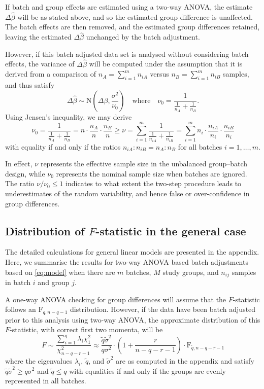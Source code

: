 \documentclass{bio}
\begin{document}
If batch and group effects are estimated using a two-way ANOVA, the estimate $\Delta\hat{\beta}$ will be as stated above, and so the estimated group difference is unaffected. The batch effects are then removed, and the estimated group differences retained, leaving the estimated $\Delta\hat{\beta}$ unchanged by the batch adjustment.

However, if this batch adjusted data set is analysed without considering batch effects, the variance of $\Delta\hat{\beta}$ will be computed under the assumption that it is derived from a comparison of $n_A=\sum_{i=1}^m n_{iA}$ versus $n_B=\sum_{i=1}^m n_{iB}$ samples, and thus satisfy
\begin{equation}
\Delta\hat{\beta}
\sim\text{N}\left(\Delta\beta,\frac{\sigma^2}{\nu_0}\right)
\quad\text{where}\quad
\nu_0=\frac{1}{\frac{1}{n_A}+\frac{1}{n_B}}.
\end{equation}
Using Jensen's inequality, we may derive
\begin{equation}
\nu_0
=\frac{1}{\frac{1}{n_A}+\frac{1}{n_B}}=n\cdot\frac{n_A}{n}\cdot\frac{n_B}{n}
\ge
\nu
=\sum_{i=1}^m \frac{1}{\frac{1}{n_{iA}}+\frac{1}{n_{iB}}}
=\sum_{i=1}^m n_i\cdot\frac{n_{iA}}{n_i}\cdot\frac{n_{iB}}{n_i}
\end{equation}
with equality if and only if the ratios $n_{iA}:n_{iB}=n_A:n_B$ for all batches $i=1,\ldots,m$.

In effect, $\nu$ represents the effective sample size in the unbalanced group--batch design, while $\nu_0$ represents the nominal sample size when batches are ignored. The ratio $\nu/\nu_0\le1$ indicates to what extent the two-step procedure leads to underestimates of the random variability, and hence false or over-confidence in group differences.


\subsection{Distribution of $F$-statistic in the general case}

The detailed calculations for general linear models are presented in the appendix. Here, we summarise the results for two-way ANOVA based batch adjustments based on \eqref{eq:model} when there are $m$ batches, $M$ study groups, and $n_{ij}$ samples in batch $i$ and group $j$.

A one-way ANOVA checking for group differences will assume that the $F$-statistic follows an $\text{F}_{q,n-q-1}$ distribution. However, if the data have been batch adjusted prior to this analysis using two-way ANOVA, the approximate distribution of this $F$-statistic, with correct first two momenta, will be
\begin{equation}
F\sim\frac{\sum_{i=1}^q\lambda_i\chi^2_{1}}{\chi^2_{n-q-r-1}}
\approx\frac{\tilde q\tilde\sigma^2}{q\sigma^2}\cdot\left(1+\frac{r}{n-q-r-1}\right)\cdot\text{F}_{\tilde q,n-q-r-1}
\end{equation}
where the eigenvalues $\lambda_i$, $\tilde q$, and $\tilde\sigma^2$ are as computed in the appendix and satisfy $\tilde q\tilde\sigma^2\ge q\sigma^2$ and $\tilde q\le q$ with equalities if and only if the groups are evenly represented in all batches.
\end{document}
